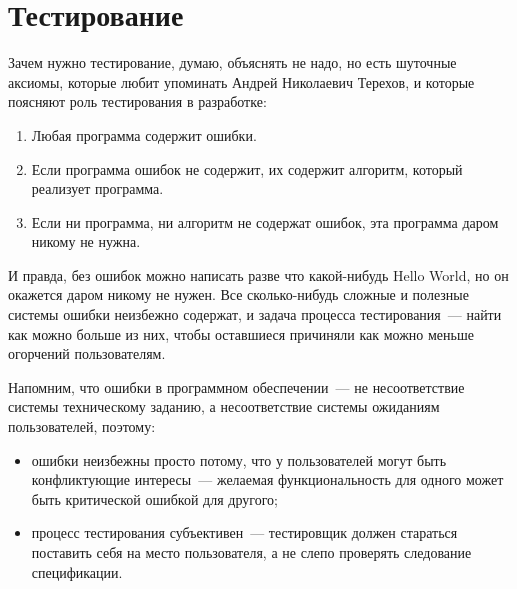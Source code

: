 \documentclass{../../text-style}
\begin{document}
\maketitle
\thispagestyle{empty}

\section{Тестирование}

Зачем нужно тестирование, думаю, объяснять не надо, но есть шуточные аксиомы, которые любит упоминать Андрей Николаевич Терехов, и которые поясняют роль тестирования в разработке:

\begin{enumerate}
    \item Любая программа содержит ошибки.
    \item Если программа ошибок не содержит, их содержит алгоритм, который реализует программа.
    \item Если ни программа, ни алгоритм не содержат ошибок, эта программа даром никому не нужна.
\end{enumerate}

И правда, без ошибок можно написать разве что какой-нибудь Hello World, но он окажется даром никому не нужен. Все сколько-нибудь сложные и полезные системы ошибки неизбежно содержат, и задача процесса тестирования~--- найти как можно больше из них, чтобы оставшиеся причиняли как можно меньше огорчений пользователям.

Напомним, что ошибки в программном обеспечении~--- не несоответствие системы техническому заданию, а несоответствие системы ожиданиям пользователей, поэтому:

\begin{itemize}
    \item ошибки неизбежны просто потому, что у пользователей могут быть конфликтующие интересы~--- желаемая функциональность для одного может быть критической ошибкой для другого;
    \item процесс тестирования субъективен~--- тестировщик должен стараться поставить себя на место пользователя, а не слепо проверять следование спецификации.
\end{itemize}
\end{document}

